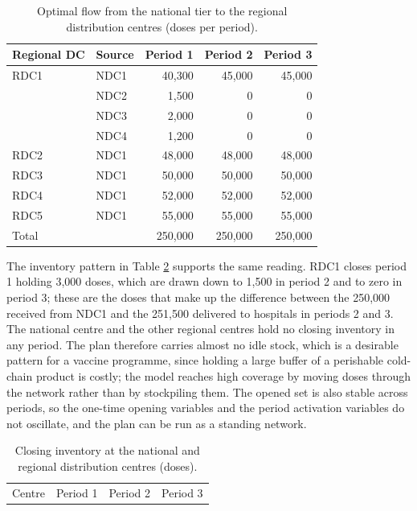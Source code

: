 \documentclass[a4paper]{elsarticle}
\begin{document}
{\begin{table}[h]
\centering
\caption{Optimal flow from the national tier to the regional distribution centres (doses per period).}
\label{tab:11}
\begin{tabular}{llrrr}
\toprule
Regional DC & Source & Period 1 & Period 2 & Period 3 \\
\midrule
RDC1 & NDC1 & 40,300 & 45,000 & 45,000 \\
     & NDC2 & 1,500 & 0 & 0 \\
     & NDC3 & 2,000 & 0 & 0 \\
     & NDC4 & 1,200 & 0 & 0 \\
RDC2 & NDC1 & 48,000 & 48,000 & 48,000 \\
RDC3 & NDC1 & 50,000 & 50,000 & 50,000 \\
RDC4 & NDC1 & 52,000 & 52,000 & 52,000 \\
RDC5 & NDC1 & 55,000 & 55,000 & 55,000 \\
\midrule
Total & & 250,000 & 250,000 & 250,000 \\
\bottomrule
\end{tabular}
\end{table}
The inventory pattern in Table \ref{tab:inventory} supports the same reading. RDC1 closes period 1 holding 3,000 doses, which are drawn down to 1,500 in period 2 and to zero in period 3; these are the doses that make up the difference between the 250,000 received from NDC1 and the 251,500 delivered to hospitals in periods 2 and 3. The national centre and the other regional centres hold no closing inventory in any period. The plan therefore carries almost no idle stock, which is a desirable pattern for a vaccine programme, since holding a large buffer of a perishable cold-chain product is costly; the model reaches high coverage by moving doses through the network rather than by stockpiling them. The opened set is also stable across periods, so the one-time opening variables and the period activation variables do not oscillate, and the plan can be run as a standing network.
\begin{table}[h]
\centering
\caption{Closing inventory at the national and regional distribution centres (doses).}
\label{tab:inventory}
\begin{tabular}{lrrr}
\toprule
Centre & Period 1 & Period 2 & Period 3 \\

\end{tabular}
\end{table}}
\end{document}
